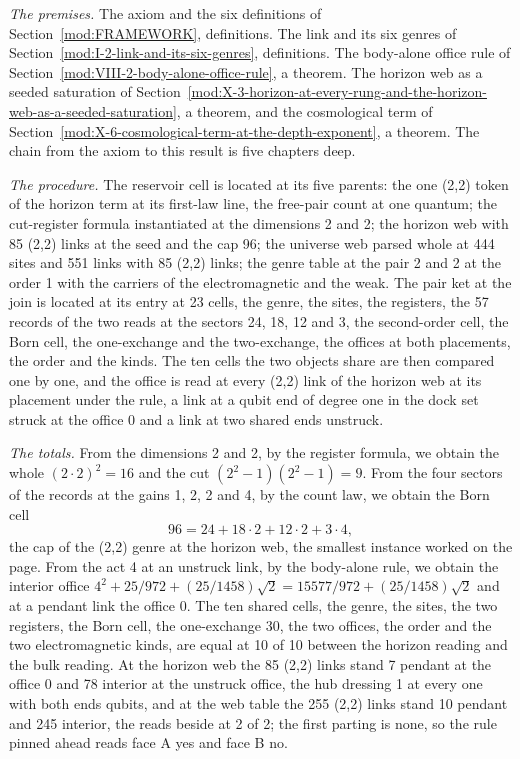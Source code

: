 \begin{chproof}
\textit{The premises.} The axiom and the six definitions of Section~\ref{mod:FRAMEWORK}, definitions. The link and its six genres of Section~\ref{mod:I-2-link-and-its-six-genres}, definitions. The body-alone office rule of Section~\ref{mod:VIII-2-body-alone-office-rule}, a theorem. The horizon web as a seeded saturation of Section~\ref{mod:X-3-horizon-at-every-rung-and-the-horizon-web-as-a-seeded-saturation}, a theorem, and the cosmological term of Section~\ref{mod:X-6-cosmological-term-at-the-depth-exponent}, a theorem. The chain from the axiom to this result is five chapters deep.

\textit{The procedure.} The reservoir cell is located at its five parents: the one (2,2) token of the horizon term at its first-law line, the free-pair count at one quantum; the cut-register formula instantiated at the dimensions 2 and 2; the horizon web with 85 (2,2) links at the seed and the cap 96; the universe web parsed whole at 444 sites and 551 links with 85 (2,2) links; the genre table at the pair 2 and 2 at the order 1 with the carriers of the electromagnetic and the weak. The pair ket at the join is located at its entry at 23 cells, the genre, the sites, the registers, the 57 records of the two reads at the sectors 24, 18, 12 and 3, the second-order cell, the Born cell, the one-exchange and the two-exchange, the offices at both placements, the order and the kinds. The ten cells the two objects share are then compared one by one, and the office is read at every (2,2) link of the horizon web at its placement under the rule, a link at a qubit end of degree one in the dock set struck at the office 0 and a link at two shared ends unstruck.

\textit{The totals.} From the dimensions 2 and 2, by the register formula, we obtain the whole $(2\cdot 2)^2 = 16$ and the cut $(2^2-1)(2^2-1) = 9$. From the four sectors of the records at the gains 1, 2, 2 and 4, by the count law, we obtain the Born cell
\begin{equation}
96 = 24 + 18\cdot 2 + 12\cdot 2 + 3\cdot 4,
\end{equation}
the cap of the (2,2) genre at the horizon web, the smallest instance worked on the page. From the act 4 at an unstruck link, by the body-alone rule, we obtain the interior office $4^2 + 25/972 + (25/1458)\sqrt{2} = 15577/972 + (25/1458)\sqrt{2}$ and at a pendant link the office 0. The ten shared cells, the genre, the sites, the two registers, the Born cell, the one-exchange 30, the two offices, the order and the two electromagnetic kinds, are equal at 10 of 10 between the horizon reading and the bulk reading. At the horizon web the 85 (2,2) links stand 7 pendant at the office 0 and 78 interior at the unstruck office, the hub dressing 1 at every one with both ends qubits, and at the web table the 255 (2,2) links stand 10 pendant and 245 interior, the reads beside at 2 of 2; the first parting is none, so the rule pinned ahead reads face A yes and face B no.


\end{chproof}
